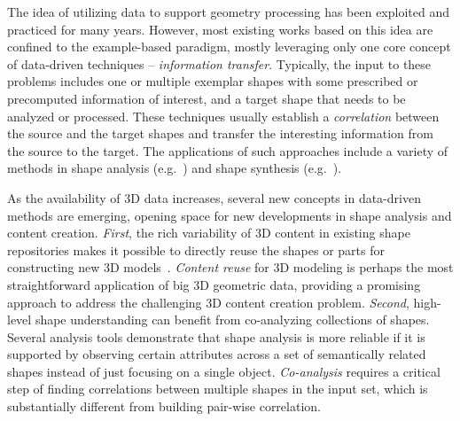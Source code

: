 The idea of utilizing data to support geometry processing has been exploited and practiced for many years. However, most existing works based on this idea are confined to the example-based paradigm, mostly leveraging only one core concept of data-driven techniques -- \emph{information transfer}. Typically, the input to these problems includes one or multiple exemplar shapes with some prescribed or precomputed information of interest, and a target shape that needs to be analyzed or processed. These techniques usually establish a \emph{correlation} between the source and the target shapes and transfer the interesting information from the source to the target. The applications of such approaches include a variety of methods in shape analysis (e.g.~\cite{Schaefer:2007:EBS}) and shape synthesis (e.g.~\cite{Merrell:2007:EBM,Ma:2014:ADS}).

As the availability of 3D data increases, several new concepts in data-driven methods are emerging, opening space for new developments in shape analysis and content creation.
\emph{First}, the rich variability of 3D content in existing shape repositories makes it possible to directly reuse the shapes or parts for constructing new 3D models~\cite{Funkhouser:2004:MBE}. \emph{Content reuse} for 3D modeling is perhaps the most straightforward application of big 3D geometric data, providing a promising approach to address the challenging 3D content creation problem.
%
\emph{Second}, high-level shape understanding can benefit from co-analyzing collections of shapes. Several analysis tools demonstrate that shape analysis is more reliable if it is supported by observing certain attributes across a set of semantically related shapes instead of just focusing on a single object. \emph{Co-analysis} requires a critical step of finding correlations between multiple shapes in the input set, which is substantially different from building pair-wise correlation. 
%



